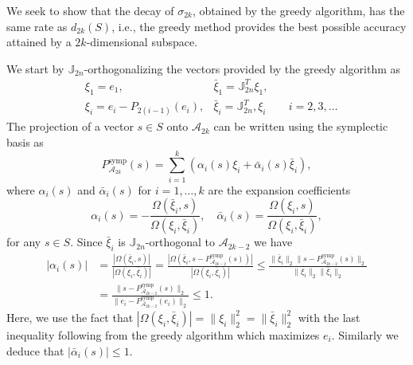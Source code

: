 We seek to show that the decay of $\sigma_{2k}$, obtained by the greedy algorithm, has the same rate as $d_{2k}(S)$, i.e., the greedy method provides the best possible accuracy attained by a $2k$-dimensional subspace.

We start by $\mathbb J_{2n}$-orthogonalizing the vectors provided by the greedy algorithm as
\begin{equation} \label{eq:new6}
\begin{aligned}
	& \xi_1 = e_1, & \bar{\xi}_1 = \mathbb{J}_{2n}^T \xi_1, &\\
	& \xi_i = e_i - P_{2(i-1)} (e_i), & \bar{\xi}_i = \mathbb{J}_{2n}^T, \xi_i &\quad i = 2,3,\dots
\end{aligned}
\end{equation}
The projection of a vector $s\in S$ onto $\mathcal A_{2k}$ can be written using the symplectic basis as
\begin{equation} \label{eq:new7}
	P_{\mathcal A_{2k}}^{\text{symp}}(s) = \sum_{i=1}^k \left( \alpha_i(s) \xi_i + \bar{\alpha}_i(s) \bar{\xi}_i \right),
\end{equation}
where $\alpha_i(s)$ and $\bar{\alpha}_i(s)$ for $i=1,\dots,k$ are the expansion coefficients
\begin{equation} \label{eq:new8}
	\alpha_i(s) = - \frac{\Omega(\bar{\xi}_i,s)}{\Omega(\xi_i,\bar{\xi}_i)}, \quad \bar{\alpha}_i(s) = \frac{\Omega(\xi_i,s)}{\Omega(\xi_i,\bar{\xi}_i)},
\end{equation}
for any $s\in S$. Since $\bar{\xi}_i$ is $\mathbb J_{2n}$-orthogonal to $\mathcal A_{2k-2}$ we have
\begin{equation} \label{eq:new9}
\begin{aligned}
	|\alpha_i(s)| &= \frac{|\Omega(\bar{\xi}_i,s)|}{|\Omega(\xi_i,\bar{\xi}_i)|} = \frac{|\Omega( \bar{\xi}_i, s - P_{\mathcal A_{2k-2}}^{\text{symp}}(s))|}{|\Omega(\xi_i,\bar{\xi}_i)|}  \leq \frac{\|\bar{\xi}_i\|_2 \| s - P_{\mathcal A_{2k-2}}^{\text{symp}}(s) \|_2}{ \|\xi_i\|_2 \|\bar{\xi}_i\|_2 } \\
	&= \frac{\| s - P_{\mathcal A_{2k-2}}^{\text{symp}}(s) \|_2}{\| e_i - P_{\mathcal A_{2k-2}}^{\text{symp}}(e_i) \|_2} \leq 1.
\end{aligned}
\end{equation}
Here, we use the fact that $ |\Omega(\xi_i,\bar{\xi}_i)| = \| \xi_i \|^2_2 = \|\bar{\xi}_i\|^2_2$ with the last inequality following from the greedy algorithm which maximizes $e_i$. Similarly we deduce that $|\bar{\alpha}_i(s)|\leq 1$.

